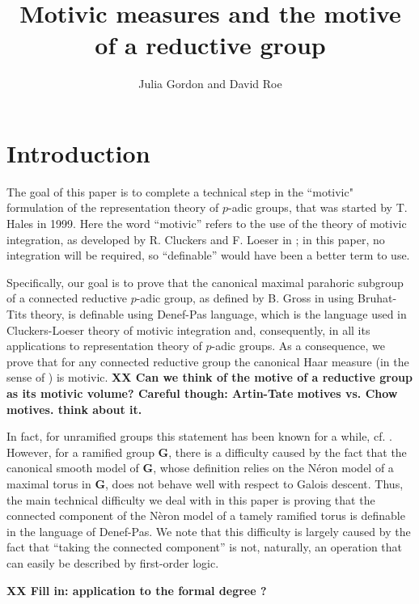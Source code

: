 \documentclass{amsart}
\title[]{Motivic measures and the motive of a reductive group}
\author{Julia Gordon and David Roe}
\newcommand{\bG}{\mathbf{G}}
\theoremstyle{plain}
\theoremstyle{definition}
\begin{document}
\maketitle

\section{Introduction}
The goal of this paper is to complete a technical step in the 
``motivic" formulation of 
the representation theory of $p$-adic groups, that was started by T. Hales in 1999. 
Here  the word ``motivic'' refers to the use of the theory of motivic integration, as developed by R. Cluckers and F. Loeser in \cite{cluckers-loeser}; in this paper, no integration will be required, so ``definable'' would have been a better term to use. 

Specifically, our goal is to prove that the canonical maximal parahoric subgroup of a connected reductive $p$-adic group, as defined by  B. Gross in \cite{gross:motive} using Bruhat-Tits theory, is definable using Denef-Pas language, which is the language used in Cluckers-Loeser theory of motivic integration and, consequently,  in all its applications to representation theory of $p$-adic groups. As a consequence, we  prove that for any connected reductive group the canonical Haar measure (in the sense of \cite{gross:motive}) is motivic.
{\bf XX Can we think of the motive of a reductive group as its motivic volume? Careful though: Artin-Tate motives vs. Chow motives. think about it.}

In fact, for unramified groups this statement has been known for a while, cf. \cite{cluckers-hales-loeser}. However, for a ramified group $\bG$, there is a difficulty caused by the fact that the canonical smooth model of $\bG$, whose definition relies on the N\'eron model of a maximal torus in $\bG$, does not behave well with respect to Galois descent. Thus, the main technical difficulty we deal with in this paper is proving that the connected component of the N\`eron model of a tamely ramified torus is definable in the language of Denef-Pas. We note that this difficulty is largely caused by the fact that ``taking the connected component'' is not, naturally, an operation that can easily be described by first-order logic. 

{\bf XX Fill in: application to the formal degree ?}
\end{document}

